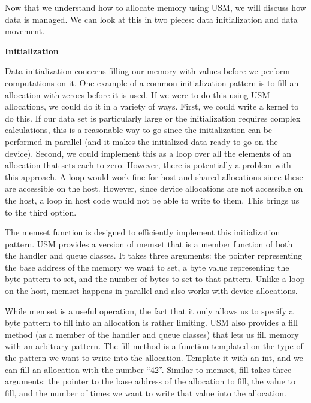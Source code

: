 Now that we understand how to allocate memory using USM, we will discuss how data is managed. We can look at this in two pieces: data initialization and data movement.\par

\hspace*{\fill} \par %
\textbf{Initialization}

Data initialization concerns filling our memory with values before we perform computations on it. One example of a common initialization pattern is to fill an allocation with zeroes before it is used. If we were to do this using USM allocations, we could do it in a variety of ways. First, we could write a kernel to do this. If our data set is particularly large or the initialization requires complex calculations, this is a reasonable way to go since the initialization can be performed in parallel (and it makes the initialized data ready to go on the device). Second, we could implement this as a loop over all the elements of an allocation that sets each to zero. However, there is potentially a problem with this approach. A loop would work fine for host and shared allocations since these are accessible on the host. However, since device allocations are not accessible on the host, a loop in host code would not be able to write to them. This brings us to the third option.\par

The memset function is designed to efficiently implement this initialization pattern. USM provides a version of memset that is a member function of both the handler and queue classes. It takes three arguments: the pointer representing the base address of the memory we want to set, a byte value representing the byte pattern to set, and the number of bytes to set to that pattern. Unlike a loop on the host, memset happens in parallel and also works with device allocations.\par

While memset is a useful operation, the fact that it only allows us to specify a byte pattern to fill into an allocation is rather limiting. USM also provides a fill method (as a member of the handler and queue classes) that lets us fill memory with an arbitrary pattern. The fill method is a function templated on the type of the pattern we want to write into the allocation. Template it with an int, and we can fill an allocation with the number “42”. Similar to memset, fill takes three arguments: the pointer to the base address of the allocation to fill, the value to fill, and the number of times we want to write that value into the allocation.\par

